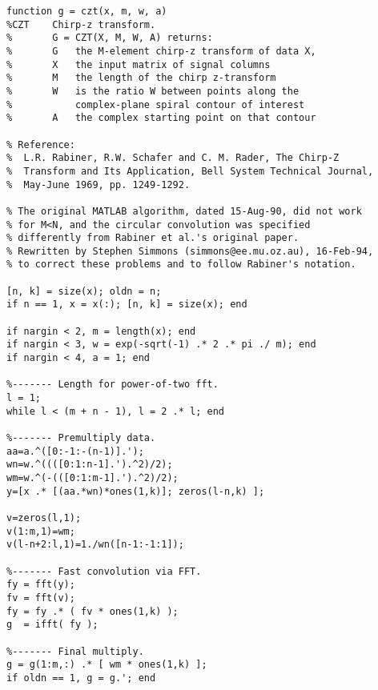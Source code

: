 \begingroup
\singlespaced\small
\begin{verbatim}
function g = czt(x, m, w, a)
%CZT    Chirp-z transform.
%       G = CZT(X, M, W, A) returns:
%       G   the M-element chirp-z transform of data X,
%       X   the input matrix of signal columns
%       M   the length of the chirp z-transform
%       W   is the ratio W between points along the
%           complex-plane spiral contour of interest
%       A   the complex starting point on that contour

% Reference:
%  L.R. Rabiner, R.W. Schafer and C. M. Rader, The Chirp-Z 
%  Transform and Its Application, Bell System Technical Journal, 
%  May-June 1969, pp. 1249-1292.

% The original MATLAB algorithm, dated 15-Aug-90, did not work
% for M<N, and the circular convolution was specified
% differently from Rabiner et al.'s original paper.  
% Rewritten by Stephen Simmons (simmons@ee.mu.oz.au), 16-Feb-94,
% to correct these problems and to follow Rabiner's notation.

[n, k] = size(x); oldn = n;
if n == 1, x = x(:); [n, k] = size(x); end

if nargin < 2, m = length(x); end
if nargin < 3, w = exp(-sqrt(-1) .* 2 .* pi ./ m); end
if nargin < 4, a = 1; end

%------- Length for power-of-two fft.
l = 1;
while l < (m + n - 1), l = 2 .* l; end

%------- Premultiply data.
aa=a.^([0:-1:-(n-1)].');
wn=w.^((([0:1:n-1].').^2)/2);
wm=w.^(-(([0:1:m-1].').^2)/2);
y=[x .* [(aa.*wn)*ones(1,k)]; zeros(l-n,k) ];

v=zeros(l,1);
v(1:m,1)=wm;
v(l-n+2:l,1)=1./wn([n-1:-1:1]);

%------- Fast convolution via FFT.
fy = fft(y);
fv = fft(v);
fy = fy .* ( fv * ones(1,k) );
g  = ifft( fy );

%------- Final multiply.
g = g(1:m,:) .* [ wm * ones(1,k) ];
if oldn == 1, g = g.'; end
\end{verbatim}
\endgroup
